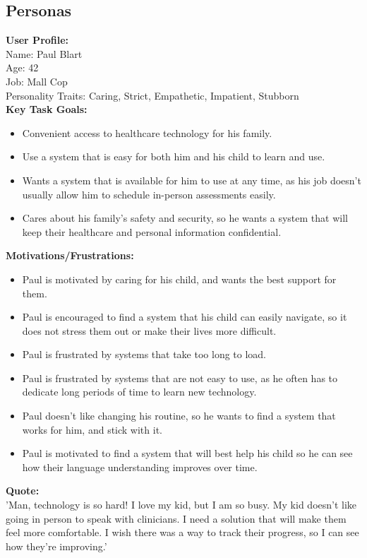 \documentclass[12pt]{article}
\begin{document}
\subsection{Personas}
\textbf{User Profile:}\\
Name: Paul Blart\\
Age: 42\\
Job: Mall Cop\\
Personality Traits: Caring, Strict, Empathetic, Impatient, Stubborn\\

\textbf{Key Task Goals:}
\begin{itemize}
  \item Convenient access to healthcare technology for his family.
  \item Use a system that is easy for both him and his child to learn and use.
  \item Wants a system that is available for him to use at any time, as his job doesn't usually allow him to schedule in-person assessments easily.
  \item Cares about his family's safety and security, so he wants a system that will keep their healthcare and personal information confidential.  
\end{itemize}

\textbf{Motivations/Frustrations:}
\begin{itemize}
  \item Paul is motivated by caring for his child, and wants the best support for them.
  \item Paul is encouraged to find a system that his child can easily navigate, so it does not stress them out or make their lives more difficult.
  \item Paul is frustrated by systems that take too long to load.
  \item Paul is frustrated by systems that are not easy to use, as he often has to dedicate long periods of time to learn new technology.
  \item Paul doesn't like changing his routine, so he wants to find a system that works for him, and stick with it.
  \item Paul is motivated to find a system that will best help his child so he can see how their language understanding improves over time.
\end{itemize}

\textbf{Quote:}\\
'Man, technology is so hard! I love my kid, but I am so busy. My kid doesn't like going in person to speak with clinicians. I need a solution that will make them feel more comfortable. I wish there was a way to track their progress, so I can see how they're improving.'\\
\end{document}
